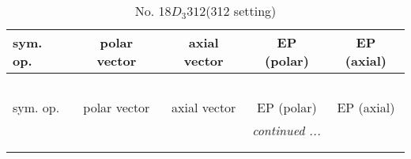 \documentclass[fleqn,10pt,landscape]{jsarticle}
\begin{document}
\newpage
\begin{center}
\renewcommand{\arraystretch}{1.3}
\begin{longtable}{lcccc}
\caption{No. 18\quad$D_{3}$\quad$312$\quad(312 setting)\quad[ trigonal ]}
 \\
 \hline \hline
sym. op. & polar vector & axial vector & EP (polar) & EP (axial) \\ \hline \endfirsthead

\multicolumn{4}{l}{\tablename\ \thetable{}} \\
 \hline \hline
sym. op. & polar vector & axial vector & EP (polar) & EP (axial) \\ \hline \endhead

 \hline \hline
\multicolumn{4}{r}{\footnotesize\it continued ...} \\ \endfoot

 \hline \hline
\multicolumn{4}{r}{} \\ \endlastfoot


\end{longtable}
\end{center}
\end{document}
